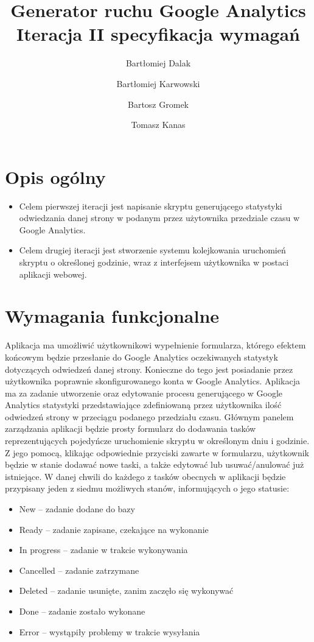 \documentclass{article}
\title{Generator ruchu Google Analytics \\ Iteracja II specyfikacja wymagań}
\author{Bartłomiej Dalak \and Bartłomiej Karwowski \and Bartosz Gromek \and Tomasz Kanas}
\begin{document}
    \maketitle
    
    \section{Opis ogólny}
    \begin{itemize}
    \item Celem pierwszej iteracji jest napisanie skryptu generującego statystyki odwiedzania danej strony w podanym przez użytownika przedziale czasu w Google Analytics.
    \item Celem drugiej iteracji jest stworzenie systemu kolejkowania uruchomień skryptu o określonej godzinie, wraz z interfejsem użytkownika w postaci aplikacji webowej.
    \end{itemize}

    \vspace{7\baselineskip}

    \section{Wymagania funkcjonalne}
    
    Aplikacja ma umożliwić użytkownikowi wypełnienie formularza, którego efektem końcowym będzie przesłanie do Google Analytics oczekiwanych statystyk dotyczących odwiedzeń danej strony. Konieczne do tego jest posiadanie przez użytkownika poprawnie skonfigurowanego konta w Google Analytics. Aplikacja ma za zadanie utworzenie oraz edytowanie procesu generującego w Google Analytics statystyki przedstawiające zdefiniowaną przez użytkownika ilość odwiedzeń strony w przeciągu podanego przedziału czasu. Głównym panelem zarządzania aplikacji będzie prosty formularz do dodawania tasków reprezentujących pojedyńcze uruchomienie skryptu w określonym dniu i godzinie. Z jego pomocą, klikając odpowiednie przyciski zawarte w formularzu, użytkownik będzie w stanie dodawać nowe taski, a także edytować lub usuwać/anulować już istniejące. W danej chwili do każdego z tasków obecnych w aplikacji będzie przypisany jeden z siedmu możliwych stanów, informujących o jego statusie:
    
    \begin{itemize}
        \item New -- zadanie dodane do bazy
        \item Ready -- zadanie zapisane, czekające na wykonanie
        \item In progress -- zadanie w trakcie wykonywania
        \item Cancelled -- zadanie zatrzymane
        \item Deleted -- zadanie usunięte, zanim zaczęło się wykonywać
        \item Done -- zadanie zostało wykonane
        \item Error -- wystąpiły problemy w trakcie wysyłania
        \end{itemize}
    
\end{document}
